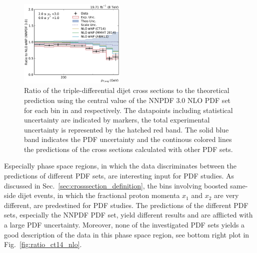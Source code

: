 \begin{figure}[htbp]
    \includegraphics[width=0.45\textwidth]{figures/measurement/ratio_to_NNPDF30+np_totcomp_yb2ys0.pdf}
    \caption[Ratio of the cross section to NNPDF 3.0 NLO]{
    Ratio of the triple-differential dijet cross sections to the theoretical
    prediction using the central value of the NNPDF 3.0 NLO PDF set for each bin in \ystar
    and \yboost respectively. The datapoints including statistical uncertainty are
    indicated by markers, the total experimental uncertainty is represented by the
    hatched red band. The solid blue band indicates the PDF uncertainty and the
    continous colored lines the predictions of the cross sections calculated with
    other PDF sets. }

    \label{fig:ratio_nnpdf30_nlo}
\end{figure}

Especially phase space regions, in which the data discriminates between the
predictions of different PDF sets, are interesting input for PDF studies. As
discussed in Sec.~\ref{sec:crosssection_definition}, the bins involving boosted
same-side dijet events, in which the fractional proton momenta $x_1$ and $x_2$
are very different, are predestined for PDF studies. The predictions of the
different PDF sets, especially the NNPDF PDF set, yield different results and
are afflicted with a large PDF uncertainty. Moreover, none of the investigated
PDF sets yields a good description of the data in this phase space region, see
bottom right plot in Fig.~\ref{fig:ratio_ct14_nlo}.



